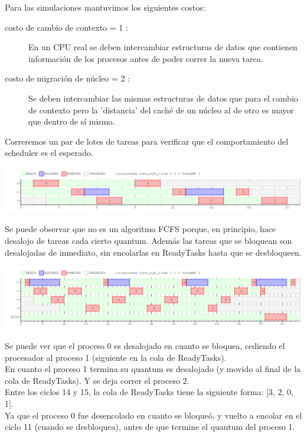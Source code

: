 Para las simulaciones mantuvimos los siguientes costos:
\begin{description}
 \item[costo de cambio de contexto = 1 :]{En un CPU real se deben intercambiar estructuras de datos que contienen información de los procesos antes de poder correr la nueva tarea.}
 \item[costo de migración de núcleo = 2 :]{Se deben intercambiar las mismas estructuras de datos que para el cambio de contexto pero la 'distancia' del caché de un núcleo al de otro es mayor que dentro de sí mismo.}
\end{description}

Correremos un par de lotes de tareas para verificar que el comportamiento del scheduler es el esperado.

\begin{center}
 \includegraphics[scale=0.48]{./RR/RR_simple.png}
\end{center}

Se puede observar que no es un algoritmo FCFS porque, en principio, hace desalojo de tareas cada cierto quantum.
Además las tareas que se bloquean son desalojadas de inmediato, sin encolarlas en ReadyTasks hasta que se desbloqueen.

\begin{center}
 \includegraphics[scale=0.48]{./RR/RR_example_2.png}
\end{center}

Se puede ver que el proceso 0 es desalojado en cuanto se bloquea, cediendo el procesador al
proceso 1 (siguiente en la cola de ReadyTasks).\\
En cuanto el proceso 1 termina su quantum es desalojado (y movido al final de la cola de ReadyTasks).
Y se deja correr el proceso 2.\\

Entre los ciclos 14 y 15, la cola de ReadyTasks tiene la siguiente forma:
[3, 2, 0, 1].\\
Ya que el proceso 0 fue desencolado en cuanto se bloqueó, y vuelto a encolar en el
ciclo 11 (cuando se desbloquea), antes de que termine el quantum del proceso 1.\\

